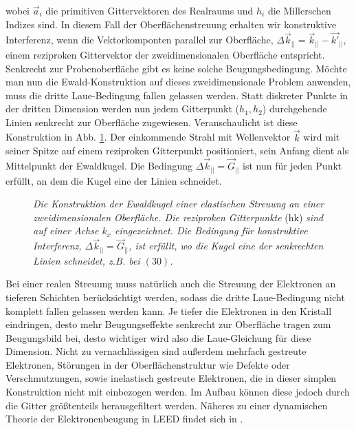 wobei $\vec{a}_i$ die primitiven Gittervektoren des Realraums und $h_i$ die Millerschen Indizes
sind. In diesem Fall der Oberflächenstreuung erhalten wir konstruktive Interferenz,
wenn die Vektorkomponten parallel zur Oberfläche, $\Delta\vec{k}_{||}=\vec{k}_{||}-\vec{k'}_{||}$,
einem reziproken Gittervektor der zweidimensionalen Oberfläche entspricht. Senkrecht zur Probenoberfläche
gibt es keine solche Beugungsbedingung. Möchte man nun die Ewald-Konstruktion auf dieses
zweidimensionale Problem anwenden, muss die dritte Laue-Bedingung fallen gelassen werden. Statt
diskreter Punkte in der dritten Dimension werden nun jedem Gitterpunkt ($h_1, h_2$) durchgehende
Linien senkrecht zur Oberfläche zugewiesen. Veranschaulicht ist diese Konstruktion in Abb.
\ref{ewald}. Der einkommende Strahl mit Wellenvektor $\vec{k}$ wird mit seiner Spitze auf einem
reziproken Gitterpunkt positioniert, sein Anfang dient als Mittelpunkt der Ewaldkugel. Die
Bedingung $\Delta \vec{k}_{||}=\vec{G}_{||}$ ist nun für jeden Punkt erfüllt, an dem die Kugel eine
der Linien schneidet. 
\begin{figure}[H]
\centering
\sffamily 

\caption{\textit{Die Konstruktion der Ewaldkugel einer elastischen Streuung an einer
zweidimensionalen Oberfläche. Die reziproken Gitterpunkte} (hk) \textit{sind auf einer Achse $k_x$
eingezeichnet. Die Bedingung für konstruktive Interferenz, $\Delta \vec{k}_{||}=\vec{G}_{||}$,  ist erfüllt, wo die Kugel eine der senkrechten Linien
schneidet, z.B. bei $(30)$. }}
\label{ewald}
\end{figure}




Bei einer realen Streuung muss natürlich auch die Streuung der Elektronen an tieferen
Schichten berücksichtigt werden, sodass die dritte Laue-Bedingung nicht komplett fallen gelassen werden
kann. Je tiefer die Elektronen in den Kristall eindringen, desto mehr Beugungseffekte senkrecht zur
Oberfläche tragen zum Beugungsbild bei, desto wichtiger wird also die Laue-Gleichung für diese
Dimension. Nicht zu vernachlässigen sind außerdem mehrfach gestreute Elektronen, Störungen in der
Oberflächenstruktur wie Defekte oder Verschmutzungen, sowie inelastisch gestreute Elektronen, die in
dieser simplen Konstruktion nicht mit einbezogen werden. Im Aufbau können diese jedoch durch die
Gitter größtenteils herausgefiltert werden. Näheres zu einer dynamischen Theorie der
Elektronenbeugung in LEED findet sich in \cite{Lueth}.

\FloatBarrier










